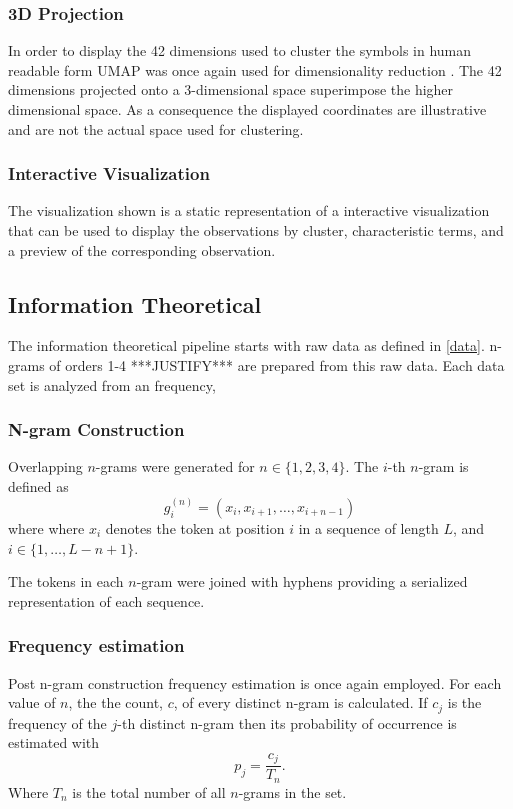 \documentclass[preprint,12pt]{elsarticle}
\begin{document}
\subsubsection{3D Projection}
In order to display the 42 dimensions used to cluster the symbols in human readable form UMAP was once again used for dimensionality reduction \cite{mcinnes2018_umap}. The 42 dimensions projected onto a 3-dimensional space superimpose the higher dimensional space. As a consequence the displayed coordinates are illustrative and are not the actual space used for clustering.

\subsubsection{Interactive Visualization}
The visualization shown is a static representation of a interactive visualization that can be used to display the observations by cluster, characteristic terms, and a preview of the corresponding observation. 

\subsection{Information Theoretical}
The information theoretical pipeline starts with raw data as defined in \ref{data}. n-grams of orders 1-4 ***JUSTIFY*** are prepared from this raw data. Each data set is analyzed from an frequency, 

\subsubsection{N-gram Construction}
Overlapping \(n\)-grams were generated for \(n \in \{1,2,3,4\}\). The \(i\)-th \(n\)-gram is defined as
\[
g_i^{(n)} = (x_i,x_{i+1},\ldots,x_{i+n-1})
\]
where where \(x_i\) denotes the token at position \(i\) in a sequence of length \(L\), and \(i \in \{1,\ldots,L-n+1\}\).

The tokens in each \(n\)-gram were joined with hyphens providing a serialized representation of each sequence. 

\subsubsection{Frequency estimation}
Post n-gram construction frequency estimation is once again employed. For each value of \(n\), the the count, \(c\), of every distinct n-gram is calculated. If \(c_j\) is the frequency of the \(j\)-th distinct n-gram then its probability of occurrence is estimated with 
\[
p_j = \frac{c_j}{T_n}.
\]
Where \(T_n\) is the total number of all \(n\)-grams in the set.
\end{document}
